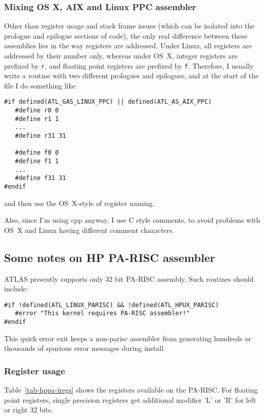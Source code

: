 \documentclass[11pt]{article}
\begin{document}
\subsubsection{Mixing OS X, AIX and Linux PPC assembler}
Other than register usage and stack frame issues (which can be isolated
into the prologue and epilogue sections of code), the only real difference
between these assemblies lies in the way registers are addressed.  Under
Linux, all registers are addressed by their number only, whereas under
OS~X, integer registers are prefixed by {\tt r}, and floating point registers
are prefixed by {\tt f}.  Therefore, I usually write a routine with
two different prologues and epilogues, and at the start of the file I
do something like:
\begin{verbatim}
#if defined(ATL_GAS_LINUX_PPC) || defined(ATL_AS_AIX_PPC)
   #define r0 0
   #define r1 1
   ...
   #define r31 31

   #define f0 0
   #define f1 1
   ...
   #define f31 31
#endif
\end{verbatim}
and then use the OS~X-style of register naming.

Also, since I'm using cpp anyway, I use C style comments, to avoid 
problems with OS~X and Linux having different comment characters.

\subsection{Some notes on HP PA-RISC assembler}
ATLAS presently supports only 32 bit PA-RISC assembly.  Such routines should
include:
\begin{verbatim}
#if !defined(ATL_LINUX_PARISC) && !defined(ATL_HPUX_PARISC)
   #error "This kernel requires PA-RISC assembler!"
#endif
\end{verbatim}
This quick error exit keeps a non-parisc assembler from generating hundreds
or thousands of spurious error messages during install.

\subsubsection{Register usage}
Table~\ref{tab-hppa-iregs} shows the registers available on the
PA-RISC.  For floating point registers, single precision registers get
additional modifier 'L' or 'R' for left or right 32 bits.
\end{document}
